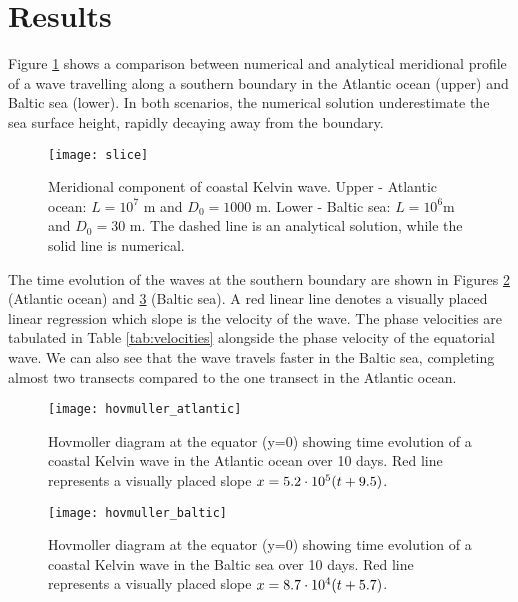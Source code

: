 \section{Results}
\label{sec:results}

Figure \ref{fig:atlanticbaltic} shows a comparison between numerical and analytical meridional profile of a wave travelling along a southern boundary in the Atlantic ocean (upper) and Baltic sea (lower). In both scenarios, the numerical solution underestimate the sea surface height, rapidly decaying away from the boundary.
	\begin{figure}[htbp]
		\centering
		\texttt{[image: slice]}
		\caption{Meridional component of coastal Kelvin wave. Upper - Atlantic ocean: $ L=10^7 $ m and $D_0 = 1000$ m. Lower - Baltic sea: $ L = 10^6 $m and $ D_0 = 30 $ m. The dashed line is an analytical solution, while the solid line is numerical.}
		\label{fig:atlanticbaltic}
	\end{figure}

The time evolution of the waves at the southern boundary are shown in Figures \ref{fig:atlantic} (Atlantic ocean) and \ref{fig:baltic} (Baltic sea). A red linear line denotes a visually placed linear regression which slope is the velocity of the wave. The phase velocities are tabulated in Table \ref{tab:velocities} alongside the phase velocity of the equatorial wave. We can also see that the wave travels faster in the Baltic sea, completing almost two transects compared to the one transect in the Atlantic ocean.
	\begin{figure}[htbp]
		\centering
		\texttt{[image: hovmuller\_atlantic]}
		\caption{Hovmoller diagram at the equator (y=0) showing time evolution of a coastal Kelvin wave in the Atlantic ocean over 10 days. Red line represents a visually placed slope $x = 5.2 \cdot 10^5 \qty(t + 9.5)$.}
		\label{fig:atlantic}
	\end{figure}

	\begin{figure}[htbp]
		\centering
		\texttt{[image: hovmuller\_baltic]}
		\caption{Hovmoller diagram at the equator (y=0) showing time evolution of a coastal Kelvin wave in the Baltic sea over 10 days. Red line represents a visually placed slope $x = 8.7 \cdot 10^4\qty(t + 5.7)$.}
		\label{fig:baltic}
	\end{figure}


